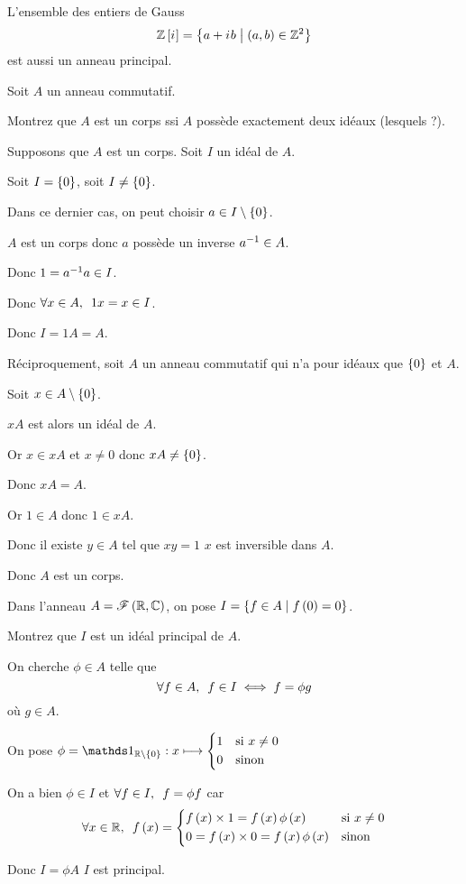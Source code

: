 \begin{rem}
L'ensemble des entiers de Gauss \[\mathbb{Z}\left[i\mkern1mu\right]=\left\lbrace a+i\mkern1mu b\;\middle|\;\left(a,b\right)\in\mathbb{Z}^2\right\rbrace\] est aussi un anneau principal.
\end{rem}

\begin{exo}
Soit \(A\) un anneau commutatif.

Montrez que \(A\) est un corps ssi \(A\) possède exactement deux idéaux (lesquels ?).
\end{exo}

\begin{corr}
Supposons que \(A\) est un corps. Soit \(I\) un idéal de \(A\).

Soit \(I=\left\lbrace0\right\rbrace\), soit \(I\not=\left\lbrace0\right\rbrace\).

Dans ce dernier cas, on peut choisir \(a\in I\setminus\left\lbrace0\right\rbrace\).

\(A\) est un corps donc \(a\) possède un inverse \(a^{-1}\in A\).

Donc \(1=a^{-1} a\in I\).

Donc \(\quantifs{\forall x\in A}1x=x\in I\).

Donc \(I=1A=A\).

Réciproquement, soit \(A\) un anneau commutatif qui n'a pour idéaux que \(\left\lbrace0\right\rbrace\) et \(A\).

Soit \(x\in A\setminus\left\lbrace0\right\rbrace\).

\(xA\) est alors un idéal de \(A\).

Or \(x\in xA\) et \(x\not=0\) donc \(xA\not=\left\lbrace0\right\rbrace\).

Donc \(xA=A\).

Or \(1\in A\) donc \(1\in xA\).

Donc il existe \(y\in A\) tel que \(xy=1\) \ie \(x\) est inversible dans \(A\).

Donc \(A\) est un corps.
\end{corr}

\begin{exo}
Dans l'anneau \(A=\mathscr{F}\left(\mathbb{R},\mathbb{C}\right)\), on pose \(I=\left\lbrace f\in A\;\middle|\; f\left(0\right)=0\right\rbrace\).

Montrez que \(I\) est un idéal principal de \(A\).
\end{exo}

\begin{corr}
On cherche \(\phi\in A\) telle que \[\quantifs{\forall f\in A}f\in I\ssi f=\phi g\] où \(g\in A\).

On pose \(\phi=\ind{\R\excluant\accol{0}}:x\mapsto\begin{dcases}
1 &\text{si }x\not=0 \\
0 &\text{sinon}
\end{dcases}\)

On a bien \(\phi\in I\) et \(\quantifs{\forall f\in I}f=\phi f\) car \[\quantifs{\forall x\in\R}f\paren{x}=\begin{dcases}
f\paren{x}\times1=f\paren{x}\phi\paren{x} &\text{si }x\not=0 \\
0=f\paren{x}\times0=f\paren{x}\phi\paren{x} &\text{sinon}
\end{dcases}\]

Donc \(I=\phi A\) \ie \(I\) est principal.
\end{corr}


